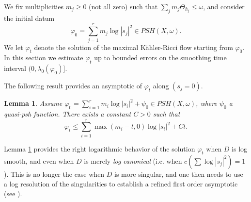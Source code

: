\documentclass[11pt]{amsart}
\numberwithin{equation}{section}
\newtheorem{lem}[theorem]{Lemma}
\newcommand{\f}{\varphi}
\newcommand{\p}{\psi}
\newcommand \la {\lambda}
\begin{document}
We fix multiplicities $m_j\geq 0$ (not all zero) such that $\sum_j m_j \Theta_{h_j} \leq \omega$, and consider 
the initial datum
 $$
\f_0= \sum_{j=1}^r m_j \log |s_j|^2 \in PSH(X,\omega).
$$
We let $\f_t$ denote the solution of the maximal K\"ahler-Ricci flow starting from $\f_0$. 
In this section we estimate $\f_t$ up to bounded errors on the smoothing time interval $(0,\la_0(\f_0)]$.

\smallskip

  
The following result provides an asymptotic of $\f_t$ along  $(s_j=0)$.
 

\begin{lem} \label{lem:log}
Assume $\f_0= \sum_{i=1}^r m_i \log |s_i|^2+\p_0 \in PSH(X,\omega)$, where 
$\p_0$ a quasi-psh function.
There exists a constant $C>0$ such that  
	\[
	\varphi_t \leq  \sum_{i=1}^r \max(m_i- t,0) \log |s_i|^2 +Ct.
	\]
\end{lem}


Lemma \ref{lem:log} provides the right logarithmic behavior of 
the solution $\f_t$ when $D$ is
log smooth, and even when $D$ is merely 
{\it log canonical} (i.e. when  $c(\sum \log |s_j|^2)=1$).
This is no longer the case when $D$ is more singular, and one then needs to  use a log resolution
of the singularities to establish a refined first order asymptotic
(see \cite{DGL26}).
\end{document}
